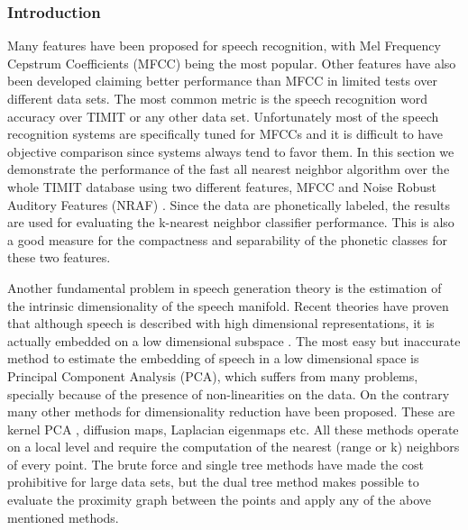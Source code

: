 \documentclass[12pt,letterpaper,doublespaced,ETD,dvips,proposal]{gtthesis}
\begin{document}
\begin{Body}
\subsubsection{Introduction}
Many features have been proposed for speech recognition, with Mel
Frequency Cepstrum Coefficients (MFCC) \cite{quatieri2002dts} being
the most popular. Other features have also been developed claiming
better performance than MFCC in limited tests over different data
sets. The most common metric is the speech recognition word accuracy
over TIMIT or any other data set. Unfortunately most of the speech
recognition systems are specifically tuned for MFCCs and it is
difficult to have objective comparison since systems always tend to
favor them.
In this section
we demonstrate the performance of the fast all nearest neighbor
algorithm over the whole TIMIT database using two different
features, MFCC and Noise Robust Auditory Features (NRAF)
\cite{ravindran:inr}. Since the data are phonetically labeled, the
results are used for evaluating the k-nearest neighbor classifier
performance. This is also a good measure for the compactness and
separability of the phonetic classes for these two features.

Another fundamental problem in speech generation theory is the
estimation of the intrinsic dimensionality of the speech manifold. Recent
theories have proven that although speech is described with high
dimensional representations, it is actually embedded on a low
dimensional subspace \cite{jansen2006ifa}. The most easy but
inaccurate method to estimate the embedding of speech in a low
dimensional space is Principal Component Analysis (PCA), which
suffers from many problems, specially because of the presence of
non-linearities on the data. On the contrary many other methods for
dimensionality reduction have been proposed. These are kernel PCA
\cite{scholkopf:nca}, diffusion maps, Laplacian eigenmaps
\cite{coifman2006dm} etc. All these methods operate on a local level
and require the computation of the nearest (range or k) neighbors of
every point. The brute force and single tree methods have made the
cost prohibitive for large data sets, but the dual tree method makes
possible to evaluate the proximity graph between the points and
apply any of the above mentioned methods.


\end{Body}
\end{document}
